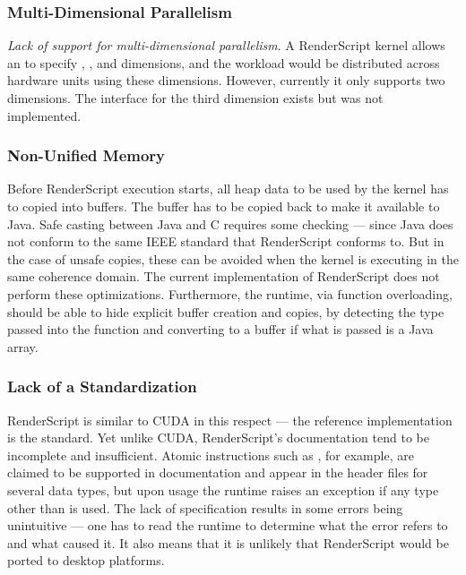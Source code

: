 \subsubsection{Multi-Dimensional Parallelism}


\textit{Lack of support for multi-dimensional parallelism}. A RenderScript
kernel allows an  to specify , , and 
dimensions, and the workload would be distributed across hardware units using
these dimensions. However, currently it only supports two
dimensions. The interface for the third dimension exists but was not
implemented.

\subsubsection{Non-Unified Memory}

Before RenderScript execution starts, all
heap data to be used by the kernel has to copied into  buffers.
The buffer has to be copied back to make it available to Java.
Safe casting between Java and C requires some checking --- since Java does not 
  conform to the same IEEE standard that RenderScript conforms to.
But in the case of unsafe copies, these can be avoided when the kernel is
  executing in the same coherence domain.
The current implementation of RenderScript does not perform these optimizations.
Furthermore, the runtime, via function overloading, should be able to hide 
  explicit buffer creation and copies, by detecting the type passed into the function
  and converting to a  buffer if what is passed is a Java array.

\subsubsection{Lack of a Standardization}

RenderScript is similar to CUDA in this respect --- the reference implementation
  is the standard.
Yet unlike CUDA, RenderScript's documentation tend to be incomplete and insufficient.
Atomic instructions such as , for example, are claimed to be supported
in documentation and appear in the header files for several data types, but upon usage 
the runtime raises an exception if any type other than  is used.
The lack of specification results in some errors being unintuitive --- one has to 
  read the runtime to determine what the error refers to and what caused it.
It also means that it is unlikely that RenderScript would be 
  ported to desktop platforms.



